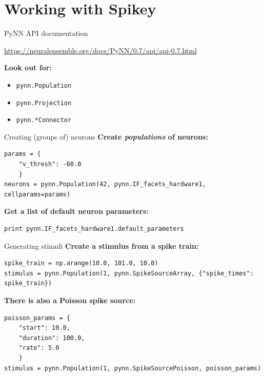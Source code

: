 \documentclass[aspectratio=169]{beamer}
\begin{document}
\section{Working with Spikey}

\begin{frame}{PyNN API documentation}
	\begin{center}
		\url{https://neuralensemble.org/docs/PyNN/0.7/api/api-0.7.html}
	\end{center}

	\vspace{3ex}

	\textbf{Look out for:}
	\begin{itemize}
		\item \texttt{pynn.Population}
		\item \texttt{pynn.Projection}
		\item \texttt{pynn.*Connector}
	\end{itemize}
\end{frame}

\begin{frame}[fragile]{Creating (groups of) neurons}
	\textbf{Create \emph{populations} of neurons:}
	\begin{verbatim}
params = {
    "v_thresh": -60.0
    }
neurons = pynn.Population(42, pynn.IF_facets_hardware1, cellparams=params)
	\end{verbatim}

	\vspace{3ex}

	\textbf{Get a list of default neuron parameters:}
	\begin{verbatim}
print pynn.IF_facets_hardware1.default_parameters
	\end{verbatim}
\end{frame}

\begin{frame}[fragile]{Generating stimuli}
	\textbf{Create a stimulus from a spike train:}
	\begin{verbatim}
spike_train = np.arange(10.0, 101.0, 10.0)
stimulus = pynn.Population(1, pynn.SpikeSourceArray, {"spike_times": spike_train})
	\end{verbatim}

	\vspace{3ex}

	\textbf{There is also a Poisson spike source:}
	\begin{verbatim}
poisson_params = {
    "start": 10.0,
    "duration": 100.0,
    "rate": 5.0
    }
stimulus = pynn.Population(1, pynn.SpikeSourcePoisson, poisson_params)
	\end{verbatim}
\end{frame}
\end{document}
